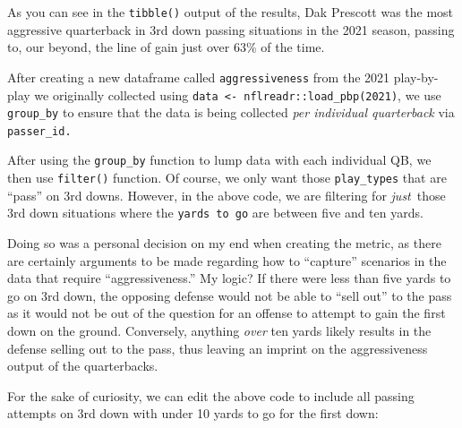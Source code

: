 \documentclass[
  letterpaper,
]{krantz}
\begin{document}
As you can see in the \texttt{tibble()} output of the results, Dak
Prescott was the most aggressive quarterback in 3rd down passing
situations in the 2021 season, passing to, our beyond, the line of gain
just over 63\% of the time.

After creating a new dataframe called \texttt{aggressiveness} from the
2021 play-by-play we originally collected using
\texttt{data\ \textless{}-\ nflreadr::load\_pbp(2021)}, we use
\texttt{group\_by} to ensure that the data is being collected \emph{per
individual quarterback} via \texttt{passer\_id.}

After using the \texttt{group\_by} function to lump data with each
individual QB, we then use \texttt{filter()} function. Of course, we
only want those \texttt{play\_types} that are ``pass'' on 3rd downs.
However, in the above code, we are filtering for \emph{just}~those 3rd
down situations where the \texttt{yards\ to\ go} are between five and
ten yards.

Doing so was a personal decision on my end when creating the metric, as
there are certainly arguments to be made regarding how to ``capture''
scenarios in the data that require ``aggressiveness.'' My logic? If
there were less than five yards to go on 3rd down, the opposing defense
would not be able to ``sell out'' to the pass as it would not be out of
the question for an offense to attempt to gain the first down on the
ground. Conversely, anything \emph{over} ten yards likely results in the
defense selling out to the pass, thus leaving an imprint on the
aggressiveness output of the quarterbacks.

For the sake of curiosity, we can edit the above code to include all
passing attempts on 3rd down with under 10 yards to go for the first
down:
\end{document}

